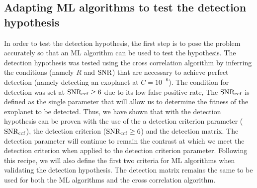 \subsection{Adapting ML algorithms to test the detection hypothesis}
In order to test the detection hypothesis, the first step is to pose the problem accurately so that an ML algorithm can be used to test the hypothesis.
The detection hypothesis was tested using the cross correlation algorithm by inferring the conditions (namely $R$ and $\rm{SNR}$) that are necessary to achieve perfect detection (namely detecting an exoplanet at $C=10^{-6}$).
The condition for detection was set at $\rm{SNR_{ccf}}\ge 6$ due to its low false positive rate,
The $\rm{SNR_{ccf}}$ is defined as the single parameter that will allow us to determine the fitness of the exoplanet to be detected.
Thus, we have shown that with the detection hypothesis can be proven with the use of the a detection criterion parameter ($\rm{SNR_{ccf}}$), the detection criterion ($\rm{SNR_{ccf}}\ge 6$) and the detection matrix.
The detection parameter will continue to remain the contrast at which we meet the detection criterion when applied to the detection criterion parameter.
Following this recipe, we will also define the first two criteria for ML algorithms when validating the detection hypothesis. 
The detection matrix remains the same to be used for both the ML algorithms and the cross correlation algorithm.


